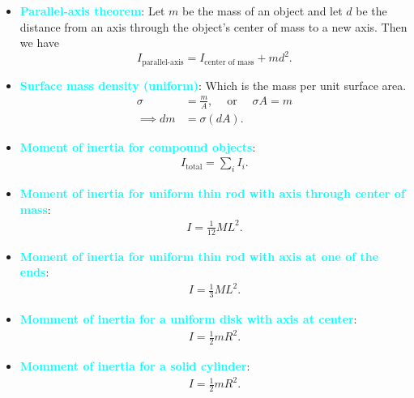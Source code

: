 \documentclass{report}
\begin{document}
\begin{itemize}
        \item \textbf{\textcolor{cyan}{Parallel-axis theorem}}:
            \bigbreak \noindent 
            Let $m$ be the mass of an object and let $d$ be the distance from an axis through the object's center of mass to a new axis. Then we have
            \[
                I_{\text{parallel-axis}} = I_{\text{center of mass}} + md^2.
            \]
        \item \textbf{\textcolor{cyan}{Surface mass density (uniform)}}: Which is the mass per unit surface area.
            \begin{align*}
                \sigma &= \frac{m}{A},\ \quad \text{or } \quad \sigma A = m\\
                \implies dm &=\sigma(dA)
            .\end{align*}
        \item \textbf{\textcolor{cyan}{Moment of inertia for compound objects}}:
            \begin{align*}
                I_{\text{total}} = \sum_i I_{i}
            .\end{align*}
        \item \textbf{\textcolor{cyan}{Moment of inertia for uniform thin rod with axis through center of mass}}:
            \begin{align*}
                I = \frac{1}{12}ML^{2}
            .\end{align*}
        \item \textbf{\textcolor{cyan}{Moment of inertia for uniform thin rod with axis at one of the ends}}:
            \begin{align*}
                I = \frac{1}{3}ML^{2}
            .\end{align*}
        \item \textbf{\textcolor{cyan}{Momment of inertia for a uniform disk with axis at center}}:
            \begin{align*}
                I = \frac{1}{2}mR^{2}
            .\end{align*}
        \item \textbf{\textcolor{cyan}{Momment of inertia for a solid cylinder}}:
            \begin{align*}
                I = \frac{1}{2}mR^{2}
            .\end{align*}

\end{itemize}
\end{document}
